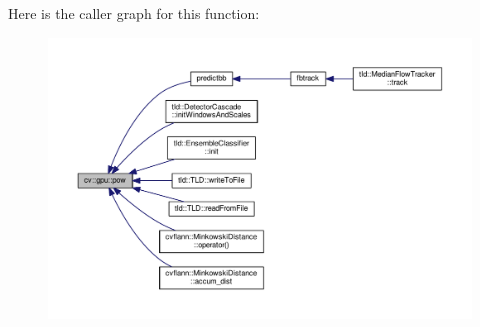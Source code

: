 Here is the caller graph for this function\-:\nopagebreak
\begin{figure}[H]
\begin{center}
\leavevmode
\includegraphics[width=350pt]{namespacecv_1_1gpu_a73a81ba0a15d1575a7f83abb657ded24_icgraph}
\end{center}
\end{figure}


